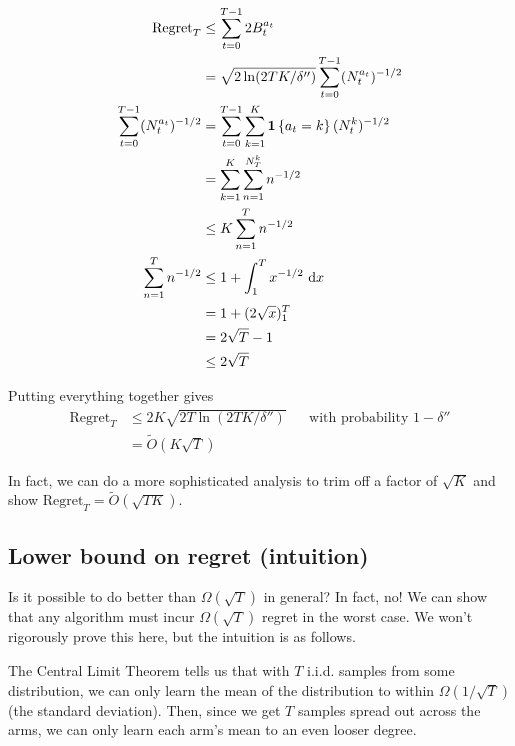 \documentclass[\main/main]{subfiles}
\begin{document}
\begin{align*}
    \text{Regret}_T                     & \le \sum_{t=0}^{T-1} 2 B^{a_t}_t                                \\
                                        & = \sqrt{2\ln(2TK/\delta'')} \sum_{t=0}^{T-1} (N^{a_t}_t)^{-1/2} \\
    \sum_{t=0}^{T-1} (N^{a_t}_t)^{-1/2} & = \sum_{t=0}^{T-1} \sum_{k=1}^K \mathbf{1}\left\{ a_t = k \right\} (N^k_t)^{-1/2}  \\
                                        & = \sum_{k=1}^K \sum_{n=1}^{N_T^k} n^{-1/2}                      \\
                                        & \le K \sum_{n=1}^T n^{-1/2}                                     \\
    \sum_{n=1}^T n^{-1/2}               & \le 1 + \int_1^T x^{-1/2} \ \mathrm{d}x                         \\
                                        & = 1 + (2 \sqrt{x})_1^T                                          \\
                                        & = 2 \sqrt{T} - 1                                                \\
                                        & \le 2 \sqrt{T}                                                  \\
\end{align*}

Putting everything together gives
\begin{align*}
    \text{Regret}_T & \le 2 K \sqrt{2T \ln(2TK/\delta'')} &  & \text{with probability } 1-\delta'' \\
                    & = \tilde O(K\sqrt{T})
\end{align*}


In fact, we can do a more sophisticated analysis to trim off a factor of $\sqrt{K}$ and show $\text{Regret}_T = \tilde O(\sqrt{TK})$.

\subsection{Lower bound on regret (intuition)}

Is it possible to do better than $\Omega(\sqrt{T})$ in general? In fact, no! We can show that any algorithm must incur $\Omega(\sqrt{T})$ regret in the worst case. We won't rigorously prove this here, but the intuition is as follows.

The Central Limit Theorem tells us that with $T$ i.i.d. samples from some distribution, we can only learn the mean of the distribution to within $\Omega(1/\sqrt{T})$ (the standard deviation). Then, since we get $T$ samples spread out across the arms, we can only learn each arm's mean to an even looser degree.
\end{document}
